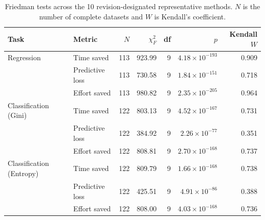 \begin{table}[t]
\centering
\caption{Friedman tests across the 10 revision-designated representative methods. $N$ is the number of complete datasets and $W$ is Kendall's coefficient.}
\label{tab:inference-friedman}
\scriptsize
\setlength{\tabcolsep}{4pt}
\begin{tabular}{@{}llrrrrr@{}}
\toprule
Task & Metric & $N$ & $\chi^2_F$ & df & $p$ & Kendall $W$ \\
\midrule
Regression & Time saved & 113 & 923.99 & 9 & $4.18\times 10^{-193}$ & 0.909 \\
 & Predictive loss & 113 & 730.58 & 9 & $1.84\times 10^{-151}$ & 0.718 \\
 & Effort saved & 113 & 980.82 & 9 & $2.35\times 10^{-205}$ & 0.964 \\
\addlinespace
Classification (Gini) & Time saved & 122 & 803.13 & 9 & $4.52\times 10^{-167}$ & 0.731 \\
 & Predictive loss & 122 & 384.92 & 9 & $2.26\times 10^{-77}$ & 0.351 \\
 & Effort saved & 122 & 808.81 & 9 & $2.70\times 10^{-168}$ & 0.737 \\
\addlinespace
Classification (Entropy) & Time saved & 122 & 809.79 & 9 & $1.66\times 10^{-168}$ & 0.738 \\
 & Predictive loss & 122 & 425.51 & 9 & $4.91\times 10^{-86}$ & 0.388 \\
 & Effort saved & 122 & 808.00 & 9 & $4.03\times 10^{-168}$ & 0.736 \\
\bottomrule
\end{tabular}
\end{table}

